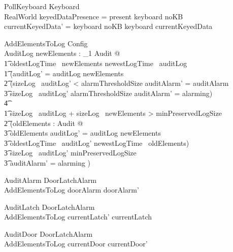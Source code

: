\begin{schema}{PollKeyboard}
        \Delta Keyboard
\\      RealWorld
\where
        keyedDataPresence = present \iff keyboard \neq noKB
\\        currentKeyedData' = \IF keyboard \neq noKB \THEN keyboard
        \ELSE currentKeyedData
\end{schema}

\begin{schema}{AddElementsToLog}
        Config
\\      \Delta AuditLog
\where
        \exists newElements : \finset_1 Audit @
\\ \t1        oldestLogTime~ newElements \geq newestLogTime~ auditLog
\also
\\ \t1 \land  (auditLog' = auditLog \cup newElements
\\ \t2  \land (sizeLog~ auditLog' < alarmThresholdSize \land
auditAlarm' = auditAlarm   
\\ \t3  \lor  sizeLog~ auditLog' \geq alarmThresholdSize \land
auditAlarm' = alarming)
\\ \t4  \lor
\\ \t1    sizeLog~ auditLog + sizeLog~ newElements > minPreservedLogSize 
\\ \t2  \land (\exists oldElements : \finset Audit  @ 
\\ \t3  oldElements \cup auditLog' = auditLog \cup newElements 
\\ \t3  \land oldestLogTime~ auditLog' \geq newestLogTime~ oldElements)
\\ \t3  \land sizeLog~ auditLog' \geq minPreservedLogSize
\\ \t3  \land auditAlarm' = alarming  )            
\end{schema}

\begin{schema}{AuditAlarm}
        \Delta DoorLatchAlarm
\\      AddElementsToLog
\where
        doorAlarm \neq doorAlarm' 
\also
\end{schema}

\begin{schema}{AuditLatch}
        \Delta DoorLatchAlarm
\\        AddElementsToLog
\where
        currentLatch' \neq currentLatch 
\end{schema}

\begin{schema}{AuditDoor}
        \Delta DoorLatchAlarm
\\        AddElementsToLog
\where
        currentDoor \neq currentDoor'
\end{schema}

